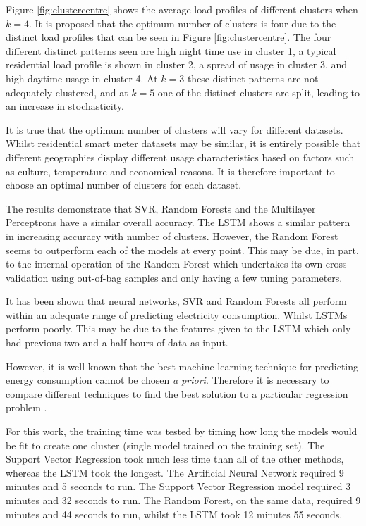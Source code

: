 Figure \ref{fig:clustercentre} shows the average load profiles of different clusters when $k=4$. It is proposed that the optimum number of clusters is four due to the distinct load profiles that can be seen in Figure \ref{fig:clustercentre}. The four different distinct patterns seen are high night time use in cluster 1, a typical residential load profile is shown in cluster 2, a spread of usage in cluster 3, and high daytime usage in cluster 4. At $k=3$ these distinct patterns are not adequately clustered, and at $k=5$ one of the distinct clusters are split, leading to an increase in stochasticity.

It is true that the optimum number of clusters will vary for different datasets. Whilst residential smart meter datasets may be similar, it is entirely possible that different geographies display different usage characteristics based on factors such as culture, temperature and economical reasons. It is therefore important to choose an optimal number of clusters for each dataset.

The results demonstrate that SVR, Random Forests and the Multilayer Perceptrons have a similar overall accuracy. The LSTM shows a similar pattern in increasing accuracy with number of clusters. However, the Random Forest seems to outperform each of the models at every point. This may be due, in part, to the internal operation of the Random Forest which undertakes its own cross-validation using out-of-bag samples and only having a few tuning parameters. 

It has been shown that neural networks, SVR and Random Forests all perform within an adequate range of predicting electricity consumption. Whilst LSTMs perform poorly. This may be due to the features given to the LSTM which only had previous two and a half hours of data as input. 

However, it is well known that the best machine learning technique for predicting energy consumption cannot be chosen \textit{a priori}. Therefore it is necessary to compare different techniques to find the best solution to a particular regression problem \cite{Ahmad2017}.

For this work, the training time was tested by timing how long the models would be fit to create one cluster (single model trained on the training set). The Support Vector Regression took much less time than all of the other methods, whereas the LSTM took the longest. The Artificial Neural Network required 9 minutes and 5 seconds to run. The Support Vector Regression model required 3 minutes and 32 seconds to run. The Random Forest, on the same data, required 9 minutes and 44 seconds to run, whilst the LSTM took 12 minutes 55 seconds. 


